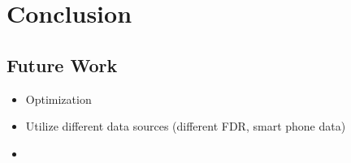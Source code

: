 \chapter{Conclusion} \label{ch:conclusion}


\section{Future Work} \label{sec:future_work}

	\begin{itemize}
    	\item Optimization
        \item Utilize different data sources (different FDR, smart phone data)
        \item 
    \end{itemize}